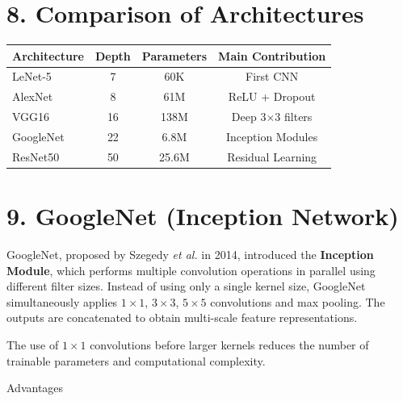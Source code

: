 \documentclass[11pt]{article}
\begin{document}

\section*{8. Comparison of Architectures}

\begin{center}

\begin{tabular}{|l|c|c|c|}

\hline

Architecture &
Depth &
Parameters &
Main Contribution\\

\hline

LeNet-5 &
7 &
60K &
First CNN\\

AlexNet &
8 &
61M &
ReLU + Dropout\\

VGG16 &
16 &
138M &
Deep 3$\times3$ filters\\

GoogleNet &
22 &
6.8M &
Inception Modules\\

ResNet50 &
50 &
25.6M &
Residual Learning\\

\hline

\end{tabular}

\end{center}

\section*{9. GoogleNet (Inception Network)}

GoogleNet, proposed by Szegedy \textit{et al.} in 2014, introduced the
\textbf{Inception Module}, which performs multiple convolution operations
in parallel using different filter sizes. Instead of using only a single
kernel size, GoogleNet simultaneously applies $1\times1$, $3\times3$,
$5\times5$ convolutions and max pooling. The outputs are concatenated to
obtain multi-scale feature representations.

The use of $1\times1$ convolutions before larger kernels reduces the
number of trainable parameters and computational complexity.


Advantages
\end{document}
